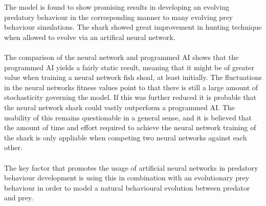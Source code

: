 The model is found to show promising results in developing an evolving predatory
behaviour in the corresponding manner to many evolving prey behaviour
simulations. The shark showed great improvement in hunting technique when
allowed to evolve via an artifical neural network.\\
\\
The comparison of the neural network and programmed AI shows that the
programmed AI yields a fairly static result, meaning that it might be
of greater value when training a neural network fish shoal, at least
initially. The fluctuations in the neural networks fitness values point to
that there is still a large amount of stochasticity governing the model. If
this was further reduced it is probable that the neural network shark could
vastly outperform a programmed AI. The usability of this remains questionable
in a general sense, and it is believed that the amount of time and effort
required to achieve the neural network training of the shark is only appliable
when competing two neural networks against each other.\\
\\
The key factor that promotes the usage of artificial neural networks in
predatory behaviour development is using this in combination with an
evolutionary prey behaviour in order to model a natural behavioural evolution
between predator and prey.

